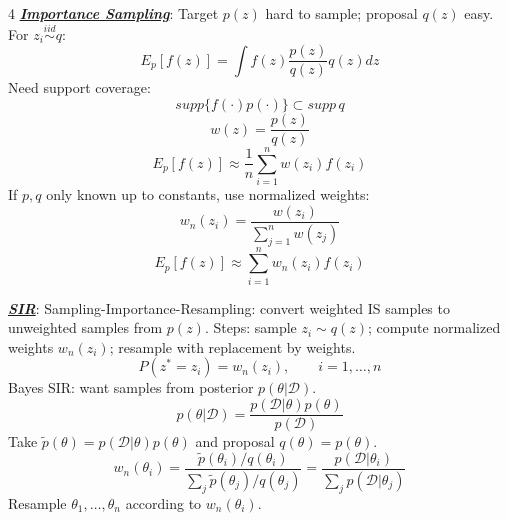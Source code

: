\documentclass[12pt]{article}
\newcommand{\bulletPoint}[1]{\ul{\textit{\textbf{#1}}}}
\begin{document}
\begin{multicols*}{4}
\bulletPoint{Importance Sampling}:
Target $p(z)$ hard to sample; proposal $q(z)$ easy. For $z_i\overset{iid}{\sim}q$:
\useshortskip \begin{equation*}
    E_p[f(z)]=\int f(z)\frac{p(z)}{q(z)}q(z)dz
\end{equation*}
Need support coverage:
\useshortskip \begin{equation*}
    supp\{f(\cdot)p(\cdot)\}\subset supp\,q
\end{equation*}
\useshortskip \begin{equation*}
    w(z)=\frac{p(z)}{q(z)}
\end{equation*}
\useshortskip \begin{equation*}
    E_p[f(z)]\approx\frac{1}{n}\sum_{i=1}^n w(z_i)f(z_i)
\end{equation*}
If $p,q$ only known up to constants, use normalized weights:
\useshortskip \begin{equation*}
    w_n(z_i)=\frac{w(z_i)}{\sum_{j=1}^n w(z_j)}
\end{equation*}
\useshortskip \begin{equation*}
    E_p[f(z)]\approx\sum_{i=1}^n w_n(z_i)f(z_i)
\end{equation*}

\bulletPoint{SIR}:
Sampling-Importance-Resampling: convert weighted IS samples to unweighted samples from $p(z)$.
Steps: sample $z_i\sim q(z)$; compute normalized weights $w_n(z_i)$; resample with replacement by weights.
\useshortskip \begin{equation*}
    P(z^*=z_i)=w_n(z_i),\qquad i=1,\ldots,n
\end{equation*}
Bayes SIR: want samples from posterior $p(\theta|\mathcal{D})$.
\useshortskip \begin{equation*}
    p(\theta|\mathcal{D})=\frac{p(\mathcal{D}|\theta)p(\theta)}{p(\mathcal{D})}
\end{equation*}
Take $\tilde{p}(\theta)=p(\mathcal{D}|\theta)p(\theta)$ and proposal $q(\theta)=p(\theta)$.
\useshortskip \begin{equation*}
    \scriptstyle w_n(\theta_i)=
    \frac{\tilde{p}(\theta_i)/q(\theta_i)}
    {\sum_j \tilde{p}(\theta_j)/q(\theta_j)}
    =\frac{p(\mathcal{D}|\theta_i)}
    {\sum_j p(\mathcal{D}|\theta_j)}
\end{equation*}
Resample $\theta_1,\ldots,\theta_n$ according to $w_n(\theta_i)$.


\end{multicols*}
\end{document}
